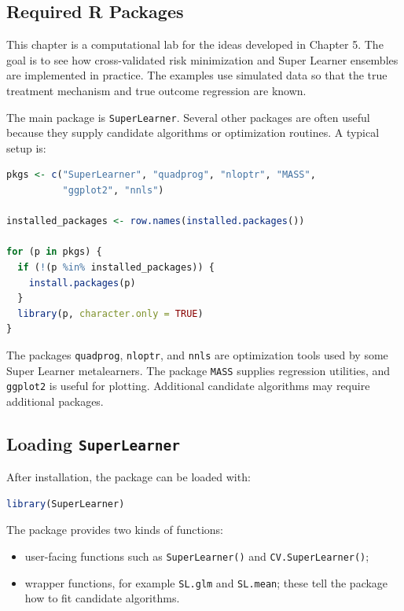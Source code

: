 \label{lec:6-1}

\subsection{Required R Packages}

This chapter is a computational lab for the ideas developed in Chapter 5. The goal is
to see how cross-validated risk minimization and Super Learner ensembles are
implemented in practice. The examples use simulated data so that the true treatment
mechanism and true outcome regression are known.

The main package is \texttt{SuperLearner}. Several other packages are often useful
because they supply candidate algorithms or optimization routines. A typical setup is:

\begin{implementationbox}
\begin{lstlisting}[language=R]
pkgs <- c("SuperLearner", "quadprog", "nloptr", "MASS",
          "ggplot2", "nnls")

installed_packages <- row.names(installed.packages())

for (p in pkgs) {
  if (!(p %in% installed_packages)) {
    install.packages(p)
  }
  library(p, character.only = TRUE)
}
\end{lstlisting}
\end{implementationbox}

The packages \texttt{quadprog}, \texttt{nloptr}, and \texttt{nnls} are optimization
tools used by some Super Learner metalearners. The package \texttt{MASS} supplies
regression utilities, and \texttt{ggplot2} is useful for plotting. Additional candidate
algorithms may require additional packages.

\subsection{Loading \texttt{SuperLearner}}

After installation, the package can be loaded with:

\begin{implementationbox}
\begin{lstlisting}[language=R]
library(SuperLearner)
\end{lstlisting}
\end{implementationbox}

The package provides two kinds of functions:
\begin{itemize}
\item user-facing functions such as \texttt{SuperLearner()} and
\texttt{CV.SuperLearner()};
\item wrapper functions, for example \texttt{SL.glm} and \texttt{SL.mean};
these tell the package how to fit candidate algorithms.
\end{itemize}

